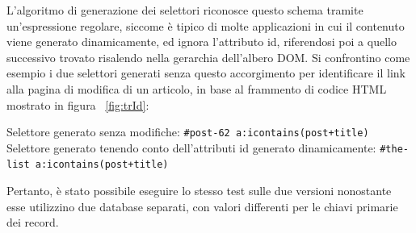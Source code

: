 L'algoritmo di generazione dei selettori riconosce questo schema tramite un'espressione regolare, siccome è tipico di molte applicazioni in cui il contenuto viene generato dinamicamente, ed ignora l'attributo id, riferendosi poi a quello successivo trovato risalendo nella gerarchia dell'albero DOM. Si confrontino come esempio i due selettori generati senza questo accorgimento per identificare il link alla pagina di modifica di un articolo, in base al frammento di codice HTML mostrato in figura ~\ref{fig:trId}:

Selettore generato senza modifiche:  \verb|#post-62 a:icontains(post+title)| 
\newline
Selettore generato tenendo conto dell'attributi id generato dinamicamente:  \verb|#the-list a:icontains(post+title)| 

Pertanto, è stato possibile eseguire lo stesso test sulle due versioni nonostante esse utilizzino due database separati, con valori differenti per le chiavi primarie dei record.